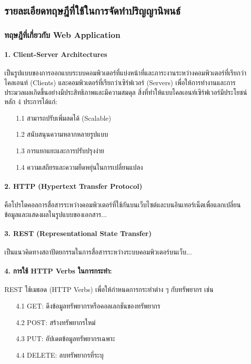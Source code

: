 \documentclass[12pt,a4paper]{article}
\begin{document}
\subsection{รายละเอียดทฤษฎีที่ใช้ในการจัดทำปริญญานิพนธ์}

\subsubsection{ทฤษฎีที่เกี่ยวกับ Web Application}

\paragraph{1. Client-Server Architectures} เป็นรูปแบบของการออกแบบระบบคอมพิวเตอร์ที่แบ่งหน้าที่และภาระงานระหว่างคอมพิวเตอร์ที่เรียกว่าไคลเอนท์ (Clients) และคอมพิวเตอร์ที่เรียกว่าเซิร์ฟเวอร์ (Servers) เพื่อให้การทำงานและการประมวลผลเกิดขึ้นอย่างมีประสิทธิภาพและมีความสมดุล สิ่งที่ทำให้แบบไคลเอนท์เซิร์ฟเวอร์มีประโยชน์หลัก 4 ประการได้แก่:

\begin{enumerate}
    \item[1.1] สามารถปรับเพิ่มลดได้ (Scalable)
    \item[1.2] สนับสนุนความหลากหลายรูปแบบ
    \item[1.3] การแยกแยะและการปรับปรุงง่าย
    \item[1.4] ความเสถียรและความยืดหยุ่นในการเปลี่ยนแปลง
\end{enumerate}

\paragraph{2. HTTP (Hypertext Transfer Protocol)} คือโปรโตคอลการสื่อสารระหว่างคอมพิวเตอร์ที่ใช้กันบนเว็บไซต์และบนอินเทอร์เน็ตเพื่อแลกเปลี่ยนข้อมูลและแสดงผลในรูปแบบของเอกสาร...

\paragraph{3. REST (Representational State Transfer)} เป็นแนวคิดทางสถาปัตยกรรมในการสื่อสารระหว่างระบบคอมพิวเตอร์บนเว็บ...

\paragraph{4. การใช้ HTTP Verbs ในการกระทำ:} REST ใช้เมธอด (HTTP Verbs) เพื่อให้กำหนดการกระทำต่าง ๆ กับทรัพยากร เช่น
\begin{enumerate}
    \item[4.1] GET: ดึงข้อมูลทรัพยากรหรือคอลเลกชันของทรัพยากร
    \item[4.2] POST: สร้างทรัพยากรใหม่
    \item[4.3] PUT: อัปเดตข้อมูลทรัพยากรเฉพาะ
    \item[4.4] DELETE: ลบทรัพยากรที่ระบุ
\end{enumerate}
\end{document}
